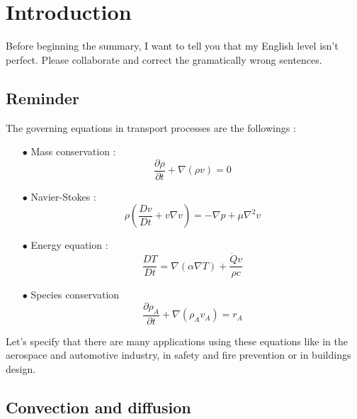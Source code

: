 
\chapter{Introduction}
Before beginning the summary, I want to tell you that my English level isn't perfect. Please collaborate and correct the gramatically wrong sentences.\\

\section{Reminder}
The governing equations in transport processes are the followings :
\begin{itemize}
	\item[$\bullet$] Mass conservation : 
	      \begin{equation}
	      	\frac{\partial \rho}{\partial t} + \nabla (\rho v) = 0
	      \end{equation}
	\item[$\bullet$] Navier-Stokes :
	      \begin{equation}
	      	\rho \left(\frac{Dv}{Dt} + v \nabla v \right) = -\nabla p + \mu \nabla ^2 v
	      \end{equation}		 
	\item[$\bullet$] Energy equation :
	      \begin{equation}
	      	\frac{DT}{Dt} = \nabla (\alpha \nabla T) + \frac{\dot{Q}v}{\rho c}
	      \end{equation}
	\item[$\bullet$] Species conservation
	      \begin{equation}
	      	\frac{\partial \rho _A}{\partial t} + \nabla (\rho _A v_A) = r_A
	      \end{equation}
\end{itemize}
Let's specify that there are many applications using these equations like in the aerospace and automotive industry, in safety and fire prevention or in buildings design.  
	
\section{Convection and diffusion}
